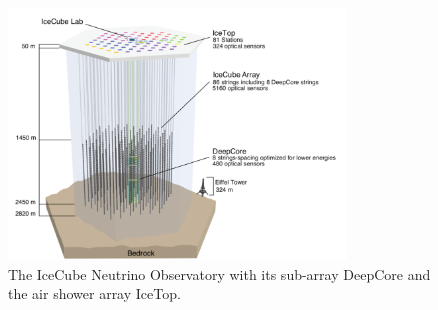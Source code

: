 \begin{figure}[!h]
 \centering
 \includegraphics[width=0.8\textwidth]{graphics/intro/ArrayWSeasonsLabels_crop.pdf}
 \caption{The IceCube Neutrino Observatory with its sub-array DeepCore and the air shower array IceTop.}
 \label{fig:array}
\end{figure}


